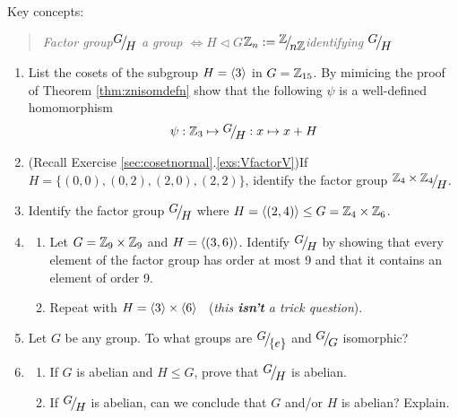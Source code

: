 \begin{exercises}
	Key concepts:
	\begin{quote}
		\emph{Factor group\qquad $\quotient GH$ a group $\iff H\triangleleft G$\qquad $\Z_n:=\quotient{\Z}{n\Z}$\qquad identifying $\quotient GH$}
	\end{quote}
	
	\begin{enumerate}
	  \item List the cosets of the subgroup $H=\left\langle 3\right\rangle$ in $G=\mathbb{Z}_{15}$. By mimicing the proof of Theorem \ref{thm:znisomdefn} show that the following $\psi$ is a well-defined homomorphism
	  \[
	  	\psi:\Z_3\mapsto \quotient GH:x\mapsto x+H
	  \]
	
		
		\item  (Recall Exercise \ref*{sec:cosetnormal}.\ref{exs:VfactorV})\lstsp If $H=\bigl\{(0,0),(0,2),(2,0),(2,2)\bigr\}$, identify the factor group $\quotient{\Z_4\times\Z_4}H$.
		
		
		\item Identify the factor group $\quotient GH$ where $H=\left\langle (2,4)\right\rangle\le G=\mathbb{Z}_4\times\mathbb{Z}_6$.
		
		
		\item\begin{enumerate}
		  \item Let $G=\mathbb{Z}_9\times\mathbb{Z}_9$ and $H=\left\langle (3,6)\right\rangle$. Identify $\quotient GH$ by showing that every element of the factor group has order at most 9 and that it contains an element of order 9.
		  
		  \item Repeat with $H=\left\langle 3\right\rangle\times\left\langle 6\right\rangle$ \ (\emph{this \textbf{isn't} a trick question}).
		\end{enumerate}
	  
	  
		\item Let $G$ be any group. To what groups are $\quotient G{\{e\}}$ and $\quotient GG$ isomorphic?
		
	
		\item\label{exs:gmodhabelian}\begin{enumerate}
		  \item If $G$ is abelian and $H\le G$, prove that $\quotient GH$ is abelian.
		  
		  \item If $\quotient GH$ is abelian, can we conclude that $G$ and/or $H$ is abelian? Explain.
		\end{enumerate}
		

\end{enumerate}
\end{exercises}
